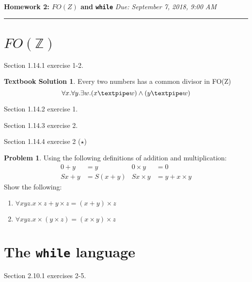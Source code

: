 \documentclass[10pt]{article}
\theoremstyle{definition}
\newtheorem{prob}{Problem}
\newtheorem{ts}{Textbook Solution}
\begin{document}
\noindent
\textbf{Homework 2: $FO(Z)$ and \texttt{while}} \hfill \emph{Due: September 7, 2018, 9:00 AM}
\hrule

\vspace{.3in}

\section*{$FO(\mathbb Z)$}

Section 1.14.1 exercise 1-2.

\begin{ts}
 Every two numbers has a common divisor in FO(Z)
 \begin{equation}
 	\forall x. \forall y. \exists w. ( x \textpipe w) \wedge (y \textpipe w)
 \end{equation}
\end{ts}

Section 1.14.2 exercise 1.

Section 1.14.3 exercise 2.

Section 1.14.4 exercise 2 ($\star$)

\begin{prob}
  Using the following definitions of addition and multiplication:
  \begin{align*}
    0 + y &= y & 0 \times y &= 0 \\
    Sx + y &= S(x + y) & Sx \times y &= y + x \times y
  \end{align*}
  Show the following:
  \begin{enumerate}[label=(\alph*)]
  \item $\forall x y z. x \times z + y \times z = (x + y) \times z$
  \item $\forall x y z. x \times (y \times z) = (x \times y) \times z$
  \end{enumerate}
\end{prob}

\section*{The \texttt{while} language}

Section 2.10.1 exercises 2-5.
\end{document}

